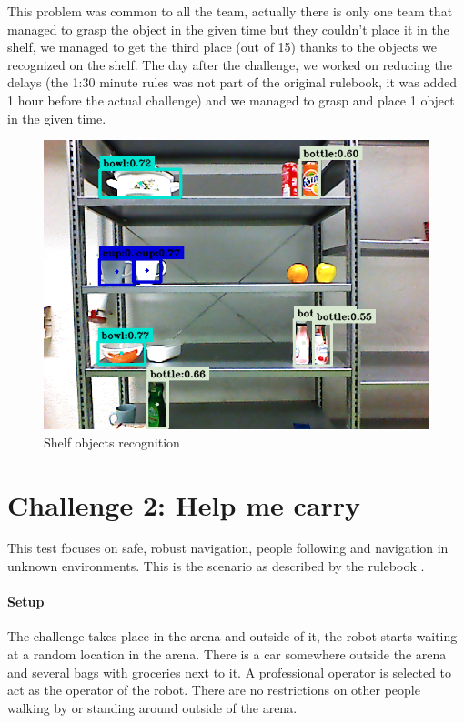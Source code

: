 \documentclass[a4paper, twocolumn]{article}
\begin{document}
    This problem was common to all the team, actually there is only one team that managed to grasp the object in the given time but they couldn't place it in the shelf, we managed to get the third place (out of 15) thanks to the objects we recognized on the shelf. The day after the challenge, we worked on reducing the delays (the 1:30 minute rules was not part of the original rulebook, it was added 1 hour before the actual challenge) and we managed to grasp and place 1 object in the given time.

    \begin{figure}
        \includegraphics[width=\columnwidth]{../img/yolo_shelf.png}
        \caption{Shelf objects recognition}
        \label{shelf_recog}
    \end{figure}

    \section{Challenge 2: Help me carry}

    This test focuses on safe, robust navigation, people following and navigation in unknown environments. This is the scenario as described by the rulebook \cite{rulebook2017}.\\

    \paragraph{Setup} The challenge takes place in the arena and outside of it, the robot starts waiting at a random location in the arena. There is a car somewhere outside the arena and several bags with groceries next to it. A professional operator is selected to act as the operator of the robot. There are no restrictions on other people walking by or standing around outside of the arena.
\end{document}

